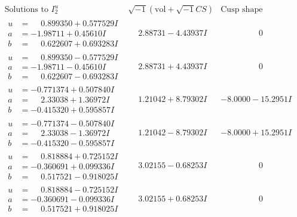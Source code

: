 \documentclass[1p]{elsarticle_modified}
\theoremstyle{definition}
\newcommand{\I}{\sqrt{-1}}
\begin{document}
$$\begin{array}{c|c|c}  
\text{Solutions to }I^u_{2}& \I (\text{vol} + \sqrt{-1}CS) & \text{Cusp shape}\\
 \hline 
\begin{aligned}
u &= \phantom{-}0.899350 + 0.577529 I \\
a &= -1.98711 + 0.45610 I \\
b &= \phantom{-}0.622607 + 0.693283 I\end{aligned}
 & \phantom{-}2.88731 - 4.43937 I & \phantom{-0.000000 } 0 \\ \hline\begin{aligned}
u &= \phantom{-}0.899350 - 0.577529 I \\
a &= -1.98711 - 0.45610 I \\
b &= \phantom{-}0.622607 - 0.693283 I\end{aligned}
 & \phantom{-}2.88731 + 4.43937 I & \phantom{-0.000000 } 0 \\ \hline\begin{aligned}
u &= -0.771374 + 0.507840 I \\
a &= \phantom{-}2.33038 + 1.36972 I \\
b &= -0.415320 + 0.595857 I\end{aligned}
 & \phantom{-}1.21042 + 8.79302 I & -8.0000 - 15.2951 I \\ \hline\begin{aligned}
u &= -0.771374 - 0.507840 I \\
a &= \phantom{-}2.33038 - 1.36972 I \\
b &= -0.415320 - 0.595857 I\end{aligned}
 & \phantom{-}1.21042 - 8.79302 I & -8.0000 + 15.2951 I \\ \hline\begin{aligned}
u &= \phantom{-}0.818884 + 0.725152 I \\
a &= -0.360691 + 0.099336 I \\
b &= \phantom{-}0.517521 - 0.918025 I\end{aligned}
 & \phantom{-}3.02155 - 0.68253 I & \phantom{-0.000000 } 0 \\ \hline\begin{aligned}
u &= \phantom{-}0.818884 - 0.725152 I \\
a &= -0.360691 - 0.099336 I \\
b &= \phantom{-}0.517521 + 0.918025 I\end{aligned}
 & \phantom{-}3.02155 + 0.68253 I & \phantom{-0.000000 } 0 \\ \hline\begin{aligned}

\end{aligned}
\end{array}$$
\end{document}
